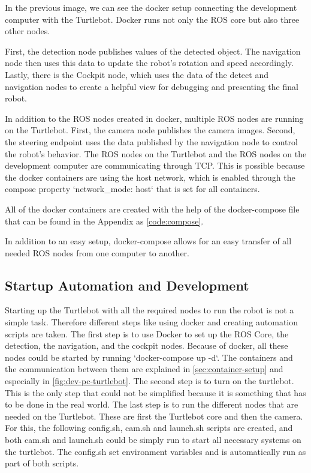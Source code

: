 In the previous image, we can see the docker setup connecting the development computer with the Turtlebot. Docker runs not only the ROS core but also three other nodes.

First, the detection node publishes values of the detected object. The navigation node then uses this data to update the robot's rotation and speed accordingly. Lastly, there is the Cockpit node, which uses the data of the detect and navigation nodes to create a helpful view for debugging and presenting the final robot.

In addition to the ROS nodes created in docker, multiple ROS nodes are running on the Turtlebot. First, the camera node publishes the camera images. Second, the steering endpoint uses the data published by the navigation node to control the robot's behavior.
The ROS nodes on the Turtlebot and the ROS nodes on the development computer are communicating through  \acf{TCP}\cite{ros-technical-overview}. This is possible because the docker containers are using the host network, which is enabled through the compose property `network\_mode: host` that is set for all containers\cite{docker-host}.

All of the docker containers are created with the help of the docker-compose file that can be found in the Appendix as \autoref{code:compose}.

In addition to an easy setup, docker-compose allows for an easy transfer of all needed ROS nodes from one computer to another.


\subsection{Startup Automation and Development}
Starting up the Turtlebot with all the required nodes to run the robot is not a simple task. Therefore different steps like using docker and creating automation scripts are taken. The first step is to use Docker to set up the ROS Core, the detection, the navigation, and the cockpit nodes. Because of docker, all these nodes could be started by running `docker-compose up -d`. The containers and the communication between them are explained in \autoref{sec:container-setup} and especially in \autoref{fig:dev-pc-turtlebot}.
The second step is to turn on the turtlebot. This is the only step that could not be simplified because it is something that has to be done in the real world.
The last step is to run the different nodes that are needed on the Turtlebot. These are first the Turtlebot core and then the camera. For this, the following config.sh, cam.sh and launch.sh scripts are created, and both cam.sh and launch.sh could be simply run to start all necessary systems on the turtlebot. The config.sh set environment variables and is automatically run as part of both scripts.

